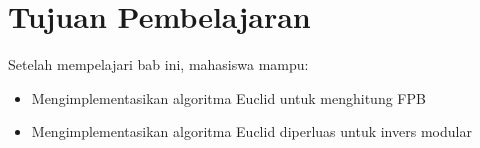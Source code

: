 \section*{Tujuan Pembelajaran}
Setelah mempelajari bab ini, mahasiswa mampu:
\begin{itemize}
\item Mengimplementasikan algoritma Euclid untuk menghitung FPB
\item Mengimplementasikan algoritma Euclid diperluas untuk invers modular
\end{itemize}
